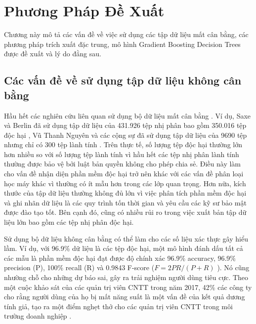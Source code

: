 \chapter{Phương Pháp Đề Xuất}
\graphicspath{{Chapter4/Figs/}}

\begin{chapabstract}
Chương này mô tả các vấn đề về việc sử dụng các tập dữ liệu mất cân bằng, các phương pháp trích xuất đặc trung, mô hình Gradient Boosting Decision Trees được đề xuất và lý do đằng sau.
\end{chapabstract}

\section{Các vấn đề về sử dụng tập dữ liệu không cân bằng}

Hầu hết các nghiên cứu liên quan sử dụng bộ dữ liệu mất cân bằng \cite{saxe2015deep,vu2017metamorphic}. 
Ví dụ, Saxe và Berlin đã sử dụng tập dữ liệu của 431.926 tệp nhị phân bao gồm 350.016 tệp độc hại \cite{saxe2015deep}, Vũ Thanh Nguyên và các cộng sự đã sử dụng tập dữ liệu của 9690 tệp nhưng chỉ có 300 tệp lành tính \cite{vu2017metamorphic}. 
Trên thực tế, số lượng tệp độc hại thường lớn hơn nhiều so với số lượng tệp lành tính vì hầu hết các tệp nhị phân lành tính thường được bảo vệ bởi luật bản quyền không cho phép chia sẻ.
Điều này làm cho vấn đề nhận diện phần mềm độc hại trở nên khác với các vấn đề phân loại học máy khác vì thường có ít mẫu hơn trong các lớp quan trọng.
Hơn nữa, kích thước của tập dữ liệu thường không đủ lớn vì việc phân tích phần mềm độc hại và ghi nhãn dữ liệu là các quy trình tốn thời gian và yêu cầu các kỹ sư bảo mật được đào tạo tốt.
Bên cạnh đó, cũng có nhiều rủi ro trong việc xuất bản tập dữ liệu lớn bao gồm các tệp nhị phân độc hại.

Sử dụng bộ dữ liệu không cân bằng có thể làm cho các số liệu xác thực gây hiểu lầm.
Ví dụ, với 96.9\% dữ liệu là các tệp độc hại, một mô hình đánh dấu tất cả các mẫu là phần mềm độc hại đạt được độ chính xác 96.9\% accuracy, 96.9\% precision (P), 100\% recall (R) và 0.9843 F-score ($F =  2PR / (P + R) $ \cite{chinchor1992muc}).
Nó cũng nhường chỗ cho những dự báo sai, gây ra trải nghiệm người dùng tiêu cực.
Theo một cuộc khảo sát của các quản trị viên CNTT trong năm 2017, 42\% các công ty cho rằng người dùng của họ bị mất năng suất là một vấn đề của kết quả dương tính giả, tạo ra một điểm nghẹt thở cho các quản trị viên CNTT trong môi trường doanh nghiệp \cite{jonathan2017survey}.

